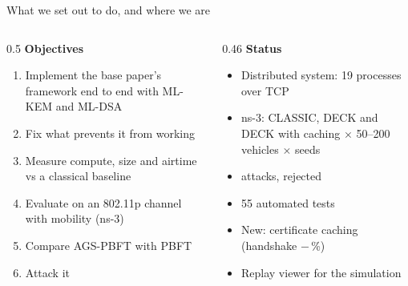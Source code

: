 \documentclass[aspectratio=169,10pt]{beamer}
\begin{document}
\begin{frame}{What we set out to do, and where we are}
\begin{columns}[T]
\begin{column}{0.5\textwidth}
\textbf{Objectives}
\begin{enumerate}
\item Implement the base paper's framework end to end with ML-KEM and ML-DSA
\item Fix what prevents it from working
\item Measure compute, size and airtime vs a classical baseline
\item Evaluate on an 802.11p channel with mobility (ns-3)
\item Compare AGS-PBFT with PBFT
\item Attack it
\end{enumerate}
\end{column}
\begin{column}{0.46\textwidth}
\textbf{Status}
\begin{itemize}
\item[\textcolor{teal}{\checkmark}] Distributed system: 19 processes over TCP
\item[\textcolor{teal}{\checkmark}] ns-3: CLASSIC, DECK and DECK with caching $\times$ 50--200 vehicles $\times$  seeds
\item[\textcolor{teal}{\checkmark}]  attacks,  rejected
\item[\textcolor{teal}{\checkmark}] 55 automated tests
\item[\textcolor{teal}{\checkmark}] New: certificate caching (handshake $-$\,\%)
\item[\textcolor{teal}{\checkmark}] Replay viewer for the simulation
\end{itemize}
\end{column}
\end{columns}
\end{frame}
\end{document}
